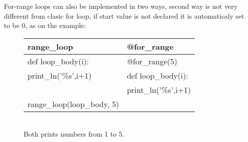 For-range loops can also be implemented in two ways, second way is not very different from clasic for loop, if start value is not declared it is automaticaly set to be 0, as on the example:

\begin{figure}[h!]
\centering
\begin{tabular}{|l|l|} \hline
\textbf{range_loop}              & \textbf{@for_range}               \\ \hline
def loop_body(i):                & @for_range(5)                    \\
\hspace{5 mm}print_ln('\%s',i+1) & def loop_body(i):                \\
                                 & \hspace{5 mm}print_ln('\%s',i+1) \\
range_loop(loop_body, 5)         &                                  \\ \hline
\end{tabular}
\begin{footnotesize}
\\ Both prints numbers from 1 to 5.
\end{footnotesize}
\end{figure}

